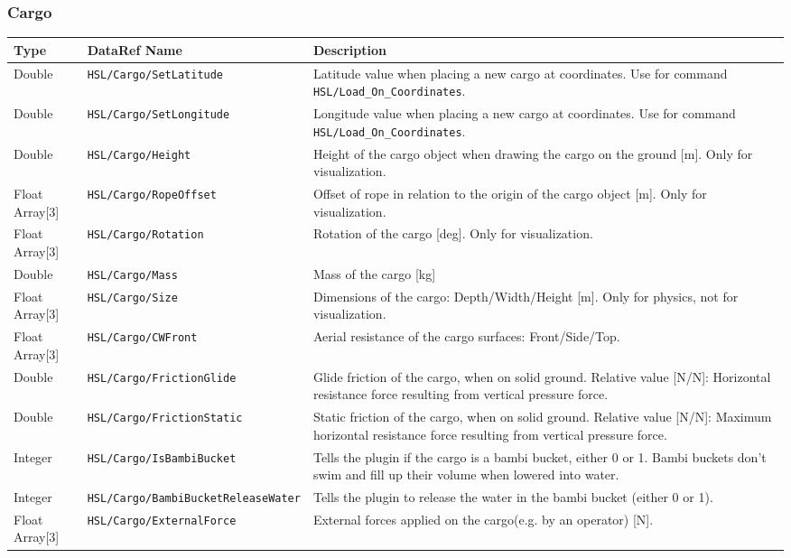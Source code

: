\documentclass[10pt,a4]{scrartcl}
\begin{document}
\subsubsection{Cargo}
\begin{tabularx}{\linewidth}{| l | l | X |} \hline
\textbf{Type} & \textbf{DataRef Name}& \textbf{Description}\\ \hline
Double & \texttt{HSL/Cargo/SetLatitude} & Latitude value when placing a new cargo at coordinates. Use for command \texttt{HSL/Load\_On\_Coordinates}.\\ \hline
Double & \texttt{HSL/Cargo/SetLongitude} & Longitude value when placing a new cargo at coordinates. Use for command \texttt{HSL/Load\_On\_Coordinates}.\\ \hline

Double & \texttt{HSL/Cargo/Height} & Height of the cargo object when drawing the cargo on the ground [m].  Only for visualization.\\ \hline
Float Array[3] & \texttt{HSL/Cargo/RopeOffset} & Offset of rope in relation to the origin of the cargo object [m]. Only for visualization.\\ \hline
Float Array[3] & \texttt{HSL/Cargo/Rotation} & Rotation of the cargo [deg]. Only for visualization.\\ \hline
Double & \texttt{HSL/Cargo/Mass} &  Mass of the cargo [kg]\\ \hline
Float Array[3] & \texttt{HSL/Cargo/Size} & Dimensions of the cargo: Depth/Width/Height [m]. Only for physics, not for visualization.\\ \hline
Float Array[3] & \texttt{HSL/Cargo/CWFront} & Aerial resistance of the cargo surfaces: Front/Side/Top.\\ \hline
Double & \texttt{HSL/Cargo/FrictionGlide} & Glide friction of the cargo, when on solid ground. Relative value [N/N]: Horizontal resistance force resulting from vertical pressure force.\\ \hline
Double & \texttt{HSL/Cargo/FrictionStatic} & Static friction of the cargo, when on solid ground. Relative value [N/N]: Maximum horizontal resistance force resulting from vertical pressure force.\\ \hline

Integer & \texttt{HSL/Cargo/IsBambiBucket} & Tells the plugin if the cargo is a bambi bucket, either 0 or 1. Bambi buckets don't swim and fill up their volume when lowered into water.\\ \hline
Integer & \texttt{HSL/Cargo/BambiBucketReleaseWater} & Tells the plugin to release the water in the bambi bucket (either 0 or 1).\\ \hline

Float Array[3] & \texttt{HSL/Cargo/ExternalForce} & External forces applied on the cargo(e.g. by an operator) [N].\\ \hline
\end{tabularx}
\end{document}
